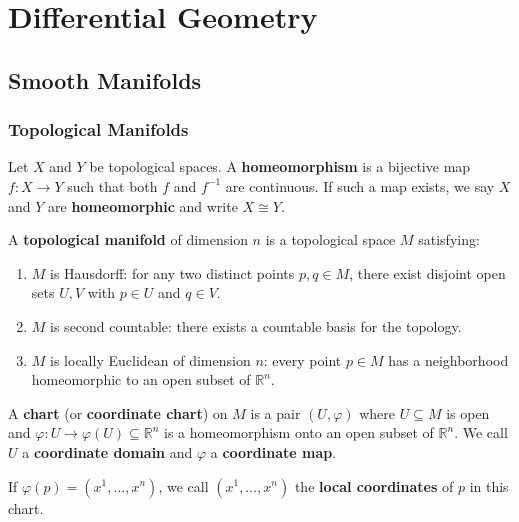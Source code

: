 \part{Differential Geometry}

\chapter{Smooth Manifolds}

\section{Topological Manifolds}

\begin{definition}[Homeomorphism]
    Let $X$ and $Y$ be topological spaces. A \textbf{homeomorphism} is a bijective map $f: X \to Y$ such that both $f$ and $f^{-1}$ are continuous. If such a map exists, we say $X$ and $Y$ are \textbf{homeomorphic} and write $X \cong Y$.
\end{definition}

\begin{definition}
    A \textbf{topological manifold} of dimension $n$ is a topological space $M$ satisfying:
    \begin{enumerate}
        \item $M$ is Hausdorff: for any two distinct points $p, q \in M$, there exist disjoint open sets $U, V$ with $p \in U$ and $q \in V$.
        \item $M$ is second countable: there exists a countable basis for the topology.
        \item $M$ is locally Euclidean of dimension $n$: every point $p \in M$ has a neighborhood homeomorphic to an open subset of $\mathbb{R}^n$.
    \end{enumerate}
\end{definition}

\begin{definition}[Chart]
    A \textbf{chart} (or \textbf{coordinate chart}) on $M$ is a pair $(U, \varphi)$ where $U \subseteq M$ is open and $\varphi: U \to \varphi(U) \subseteq \mathbb{R}^n$ is a homeomorphism onto an open subset of $\mathbb{R}^n$. We call $U$ a \textbf{coordinate domain} and $\varphi$ a \textbf{coordinate map}.

    If $\varphi(p) = (x^1, \ldots, x^n)$, we call $(x^1, \ldots, x^n)$ the \textbf{local coordinates} of $p$ in this chart.
\end{definition}

